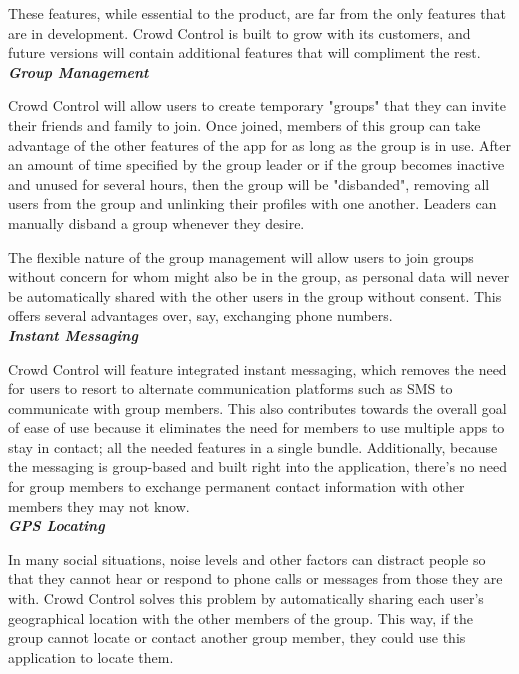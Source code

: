 These features, while essential to the product, are far from the only features that are in development.
Crowd Control is built to grow with its customers, and future versions will contain additional features
that will compliment the rest.\\

\noindent
\textit{\textbf{Group Management}}

Crowd Control will allow users to create temporary "groups" that they can invite their friends and family
to join. Once joined, members of this group can take advantage of the other features of the app for as
long as the group is in use. After an amount of time specified by the group leader or if the group
becomes inactive and unused for several hours, then the group will be "disbanded", removing all
users from the group and unlinking their profiles with one another. Leaders can manually disband a
group whenever they desire.

The flexible nature of the group management will allow users to join groups without concern for whom
might also be in the group, as personal data will never be automatically shared with the other users
in the group without consent. This offers several advantages over, say, exchanging phone numbers.\\

\noindent
\textit{\textbf{Instant Messaging}}

Crowd Control will feature integrated instant messaging, which removes the need for users to resort to
alternate communication platforms such as SMS to communicate with group members. This also
contributes towards the overall goal of ease of use because it eliminates the need for members to
use multiple apps to stay in contact; all the needed features in a single bundle. Additionally, because
the messaging is group-based and built right into the application, there's no need for group members
to exchange permanent contact information with other members they may not know.\\

\noindent
\textit{\textbf{GPS Locating}}

In many social situations, noise levels and other factors can distract people so that they cannot hear
or respond to phone calls or messages from those they are with. Crowd Control solves this problem by
automatically sharing each user's geographical location with the other members of the group. This way,
if the group cannot locate or contact another group member, they could use this application to locate
them.

